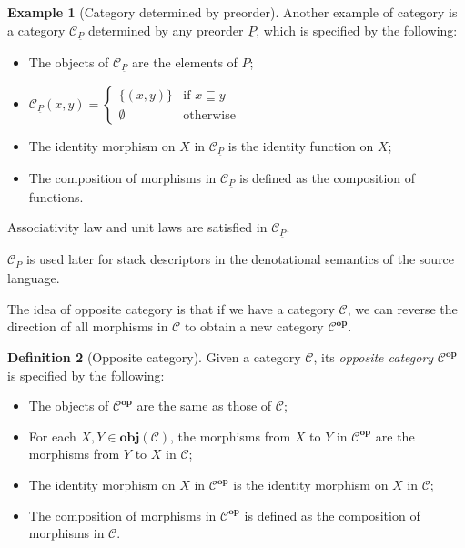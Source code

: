 \documentclass[12pt,a4paper]{report}
\theoremstyle{definition}
\newtheorem{definition}{Definition}[chapter]
\newtheorem{example}[definition]{Example}
\begin{document}
        \begin{example}[Category determined by preorder] \label{ex: category_preorder}
            Another example of category is a category $\mathcal{C}_{\underline{P}}$ determined by any preorder $\underline{P}$, which is specified by the following:
            \begin{itemize}
                \item 
                    The objects of $\mathcal{C}_{\underline{P}}$ are the elements of $P$;
                \item
                    $\mathcal{C}_{\underline{P}}(x,y) = \begin{cases}
                        \{(x,y)\} & \text{if $x \sqsubseteq y$} \\
                        \emptyset & \text{otherwise}
                    \end{cases}$
                \item
                    The identity morphism on $X$ in $\mathcal{C}_{\underline{P}}$ is the identity function on $X$;
                \item
                    The composition of morphisms in $\mathcal{C}_{\underline{P}}$ is defined as the composition of functions.
            \end{itemize}
            Associativity law and unit laws are satisfied in $\mathcal{C}_{\underline{P}}$.

            $\mathcal{C}_{\underline{P}}$ is used later for stack descriptors in the denotational semantics of the source language.
        \end{example}

        The idea of opposite category is that if we have a category $\mathcal{C}$, we can reverse the direction of all morphisms in $\mathcal{C}$ to obtain a new category $\mathcal{C}^{\textbf{op}}$.

        \begin{definition}[Opposite category] \label{def: opposite}
            Given a category $\mathcal{C}$, its \emph{opposite category} $\mathcal{C}^{\textbf{op}}$ is specified by the following:
            \begin{itemize}
                \item 
                    The objects of $\mathcal{C}^{\textbf{op}}$ are the same as those of $\mathcal{C}$;
                \item 
                    For each $X, Y \in \textbf{obj}(\mathcal{C})$, the morphisms from $X$ to $Y$ in $\mathcal{C}^{\textbf{op}}$ are the morphisms from $Y$ to $X$ in $\mathcal{C}$;
                \item 
                    The identity morphism on $X$ in $\mathcal{C}^{\textbf{op}}$ is the identity morphism on $X$ in $\mathcal{C}$;
                \item 
                    The composition of morphisms in $\mathcal{C}^{\textbf{op}}$ is defined as the composition of morphisms in $\mathcal{C}$.
            \end{itemize}
        \end{definition}
\end{document}
